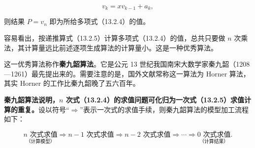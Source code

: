 \documentclass[
  10pt,
  fontset=fandol]{ctexart}
\begin{document}
\[
v_k=xv_{k-1}+a_k,
\tag{13.2.5}
\]

则结果 \(P=v_n\) 即为所给多项式（13.2.4）的值。

容易看出，按递推算式（13.2.5）计算多项式（13.2.4）的值，总共只要做 \(n\) 次乘法，其计算量远比前述逐项生成算法的计算量小。这是一种优秀算法。

这一优秀算法称作\textbf{秦九韶算法}。它是公元 13 世纪我国南宋大数学家秦九韶（1208---1261）最先提出来的。需要注意的是，国外文献常称这一算法为 Horner 算法，其实 Horner 的工作比秦九韶晚了五六百年。

\textbf{秦九韶算法说明，\(n\) 次式（13.2.4）的求值问题可化归为一次式（13.2.5）求值计算的重复。}设以符号``\(\Rightarrow\)''表示一次式的求值手续，则秦九韶算法的模型加工流程如下：

\[
\underset{\text{（计算模型）}}{n\text{ 次式求值}}
\Rightarrow n-1\text{ 次式求值}
\Rightarrow n-2\text{ 次式求值}
\Rightarrow\cdots\Rightarrow
\underset{\text{（计算结果）}}{0\text{ 次式求值}}.
\]
\end{document}
